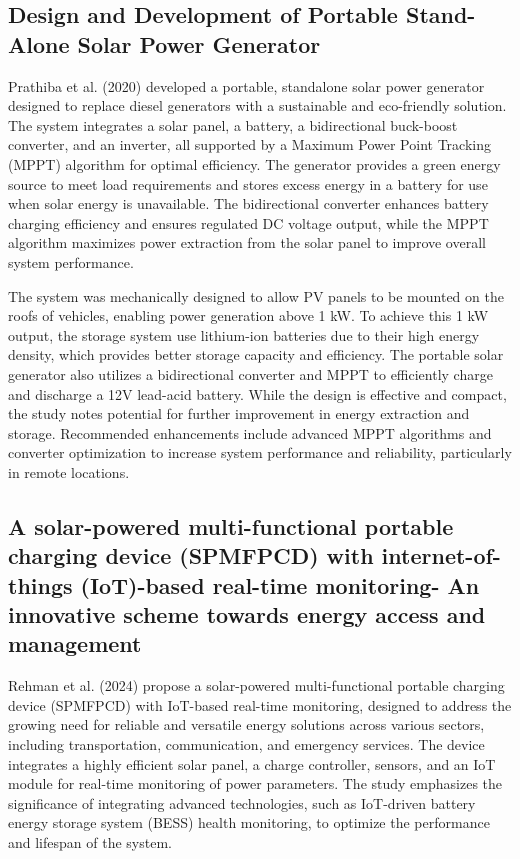 {\subsection{Design and Development of Portable Stand-Alone Solar Power Generator}
Prathiba et al. (2020) developed a portable, standalone solar power generator designed to replace diesel generators with a sustainable and eco-friendly solution. The system integrates a solar panel, a battery, a bidirectional buck-boost converter, and an inverter, all supported by a Maximum Power Point Tracking (MPPT) algorithm for optimal efficiency. The generator provides a green energy source to meet load requirements and stores excess energy in a battery for use when solar energy is unavailable. The bidirectional converter enhances battery charging efficiency and ensures regulated DC voltage output, while the MPPT algorithm maximizes power extraction from the solar panel to improve overall system performance.

The system was mechanically designed to allow PV panels to be mounted on the roofs of vehicles, enabling power generation above 1 kW. To achieve this 1 kW output, the storage system use lithium-ion batteries due to their high energy density, which provides better storage capacity and efficiency. The portable solar generator also utilizes a bidirectional converter and MPPT to efficiently charge and discharge a 12V lead-acid battery. While the design is effective and compact, the study notes potential for further improvement in energy extraction and storage. Recommended enhancements include advanced MPPT algorithms and converter optimization to increase system performance and reliability, particularly in remote locations.

\subsection{A solar-powered multi-functional portable charging device (SPMFPCD) with internet-of-things (IoT)-based real-time monitoring- An innovative scheme towards energy access and management}
Rehman et al. (2024) propose a solar-powered multi-functional portable charging device (SPMFPCD) with IoT-based real-time monitoring, designed to address the growing need for reliable and versatile energy solutions across various sectors, including transportation, communication, and emergency services. The device integrates a highly efficient solar panel, a charge controller, sensors, and an IoT module for real-time monitoring of power parameters. The study emphasizes the significance of integrating advanced technologies, such as IoT-driven battery energy storage system (BESS) health monitoring, to optimize the performance and lifespan of the system. 

}
